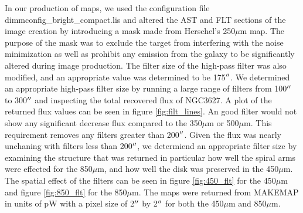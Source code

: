 In our production of maps, we used the configuration file dimmconfig\_bright\_compact.lis and altered the AST and FLT sections of the image creation by introducing a mask made from Herschel's 250$\mu$m map.  The purpose of the mask was to exclude the target from interfering with the noise minimization as well as prohibit any emission from the galaxy to be significantly altered during image production.  The filter size of the high-pass filter was also modified, and an appropriate value was determined to be 175$\mbox{$^{\prime\prime}$}$.  We determined an appropriate high-pass filter size by running a large range of filters from 100$\mbox{$^{\prime\prime}$}$ to 300$\mbox{$^{\prime\prime}$}$ and inspecting the total recovered flux of NGC3627.  A plot of the returned flux values can be seen in figure \ref{fig:filt_lines}.  An good filter would not show any significant decrease flux compared to the 350$\mu$m or 500$\mu$m.  This requirement removes any filters greater than 200$\mbox{$^{\prime\prime}$}$.  Given the flux was nearly unchaning with filters less than 200$\mbox{$^{\prime\prime}$}$, we determiend an appropriate filter size by examining the structure that was returned in particular how well the spiral arms were effected for the 850$\mu$m, and how well the disk was preserved in the 450$\mu$m.  The spatial effect of the filters can be seen in figure \ref{fig:450_flt} for the 450$\mu$m and figure \ref{fig:850_flt} for the 850$\mu$m.  The maps were returned from MAKEMAP in units of pW with a pixel size of 2$\mbox{$^{\prime\prime}$}$ by 2$\mbox{$^{\prime\prime}$}$ for both the 450$\mu$m and 850$\mu$m.

